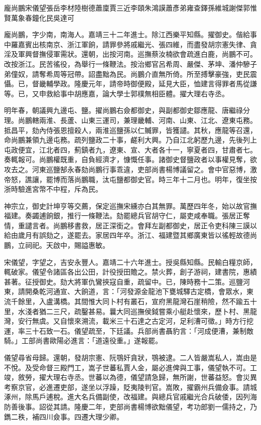 
\begin{pinyinscope}
龐尚鵬宋儀望張岳李材陸樹德蕭廩賈三近李頤朱鴻謨蕭彥弟雍查鐸孫維城謝傑郭惟賢萬象春鐘化民吳達可

龐尚鵬，字少南，南海人。嘉靖三十二年進士。除江西樂平知縣。擢御史。偕給事中羅嘉賓出核南京、浙江軍餉，請罪參將戚繼光、張四維，而盡發胡宗憲失律、貪淫及軍興督撫侵軍需狀。還朝，出按河南。巡撫蔡汝楠欲會疏進白鹿，尚鵬不可。改按浙江。民苦徭役，為舉行一條鞭法。按治鄉官呂希周、嚴傑、茅坤、潘仲驂子弟僮奴，請奪希周等冠帶。詔盡黜為民。尚鵬介直無所倚。所至搏擊豪強，吏民震懾。已，督畿輔學政。隆慶元年，請帝時御便殿，延見大臣，恤建言得罪者馬從謙等。已，又申救給事中胡應嘉，論大學士郭樸無相臣體。擢大理右寺丞。

明年春，朝議興九邊屯、鹽。擢尚鵬右僉都御史，與副都御史鄒應龍、唐繼祿分理。尚鵬轄兩淮、長蘆、山東三運司，兼理畿輔、河南、山東、江北、遼東屯務。抵昌平，劾內侍張恩擅殺人，兩淮巡鹽孫以仁贓罪，皆獲譴。其秋，應龍等召還，命尚鵬兼領九邊屯務。疏列鹽政二十事，鹺利大興。乃自江北躬歷九邊，先後列上屯政便宜，江北者四，薊鎮者九，遼東、宣、大者各十一，寧夏者四，甘肅者七。奏輒報可。尚鵬權既重，自負經濟才，慷慨任事。諸御史督鹽政者以事權見奪，欲攻去之。河東巡鹽郜永春劾尚鵬行事乖違，吏部尚書楊博議留之。會中官惡博，激帝怒，譙讓，罷博而落尚鵬職，汰屯鹽都御史官。時三年十二月也。明年，復坐按浙時驗進宮幣不中程，斥為民。

神宗立，御史計坤亨等交薦，保定巡撫宋纁亦白其無罪。萬歷四年冬，始以故官撫福建。奏蠲逋餉銀，推行一條鞭法。劾罷總兵官胡守仁，屬吏咸奉職。張居正奪情，重譴言者。尚鵬移書救，居正深銜之。會拜左副都御史，居正令吏科陳三謨以給由歲月有誤劾之，遂罷去。家居四年卒。浙江、福建暨其鄉廣東皆以徭輕故德尚鵬，立祠祀。天啟中，賜謚惠敏。

宋儀望，字望之，吉安永豐人。嘉靖二十六年進士。授吳縣知縣。民輸白糧京師，輒破家。儀望令諸區各出公田，計役授田贍之。禁火葬，創子游祠，建書院，惠績甚著。征授御史。劾大將軍仇鸞挾寇自重，疏留中。已，陳時務十二策。巡鹽河東，請開桑乾河通宣、大餉道，言：「河發源金龍池下甕城驛古定橋，會眾水，東流千餘里，入盧溝橋。其間惟大同卜村有叢石，宣府黑龍灣石崖稍險，然不踰五十里，水淺者猶二三尺，疏鑿甚易。曩大同巡撫侯鉞嘗乘小艇赴懷來，歷卜村、黑龍灣，安行無虞。又自懷來溯流，載米三十石達之古定河，足利漕可徵。」時方行挖運，率三十石致一石。儀望疏至，下廷議。兵部尚書聶豹言：「河成便漕，兼制敵騎。」工部尚書歐陽必進言：「道遠役重。」遂報罷。

儀望尋省母歸。還朝，發胡宗憲、阮鶚奸貪狀，鶚被逮。二人皆嚴嵩私人，嵩由是不悅。及受命督三殿門工，嵩子世蕃私賈人金，屬必進俾與工事，儀望執不可。工竣，敘勞，擢大理右寺丞。世蕃以為德，儀望請急歸，無所謝，世蕃益怒。會災異考察京官，必進遷吏部，遂坐以浮躁，貶夷陵判官。嵩敗，擢霸州兵備僉事。請城涿州，除馬戶逋稅。進大名兵備副使，改福建。與總兵官戚繼光合兵破倭，因列海防善後事。詔從其請。隆慶二年，吏部尚書楊博欲黜儀望，考功郎劉一儒持之，乃鐫二秩，補四川僉事。四遷大理少卿。


\end{pinyinscope}
